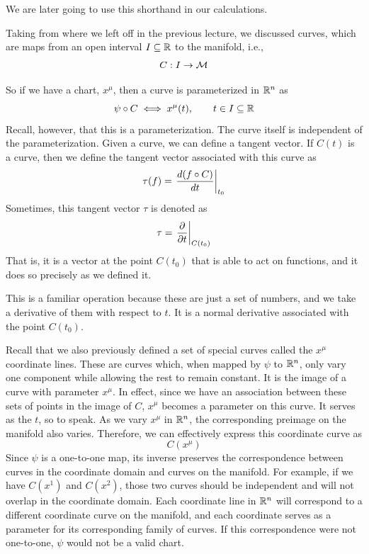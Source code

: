 		We are later going to use this shorthand in our calculations.

		Taking from where we left off in the previous lecture, we discussed
		curves, which are maps from an open interval $I\subseteq\mathbb{R}$ to the manifold,
		i.e.,
		\[
			C:I\to\mathcal{M}
		\]

		So if we have a chart, ${x^\mu}$, then a curve is parameterized in $\mathbb{R}^n$ as
		\[
			\psi\circ C \iff x^\mu(t),
			\qquad t\in I\subseteq\mathbb{R}
		\]
		Recall, however, that this is a parameterization. The curve itself is independent
		of the parameterization. Given a curve, we can define a tangent vector.
		If $C(t)$ is a curve, then we define the tangent vector associated with this
		curve as
		\[
			\tau(f) = \eval{\dv{(f\circ C)}{t}}_{t_0}
		\]
		Sometimes, this tangent vector $\tau$ is denoted as
		\begin{equation}
			\label{eq:tauatc}
			\tau = \eval{\pdv{}{t}}_{C(t_0)}
		\end{equation}
		That is, it is a vector at the point $C(t_0)$ that is able to act on functions,
		and it does so precisely as we defined it.

		This is a familiar operation because these are just a set of numbers,
		and we take a derivative of them with respect to $t$. It is a normal derivative
		associated with the point $C(t_0)$.

		Recall that we also previously defined a set of special curves called the
		$x^\mu$ coordinate lines. These are curves which, when mapped by $\psi$
		to $\mathbb{R}^n$, only vary one component while allowing the rest to remain constant.
		It is the image of a curve with parameter $x^\mu$. In effect, since we have
		an association between these sets of points in the image of $C$, $x^\mu$
		becomes a parameter on this curve. It serves as the $t$, so to speak.
		As we vary $x^\mu$ in $\mathbb{R}^n$, the corresponding preimage on the manifold
		also varies. Therefore, we can effectively express this coordinate curve as
		\[
			C(x^\mu)
		\]
		Since $\psi$ is a one-to-one map, its inverse preserves the correspondence
		between curves in the coordinate domain and curves on the manifold. For example,
		if we have $C(x^1)$ and $C(x^2)$, those two curves should be independent
		and will not overlap in the coordinate domain. Each coordinate line in $\mathbb{R}^n$
		will correspond to a different coordinate curve on the manifold, and each
		coordinate serves as a parameter for its corresponding family of curves.
		If this correspondence were not one-to-one, $\psi$ would not be a valid chart.


